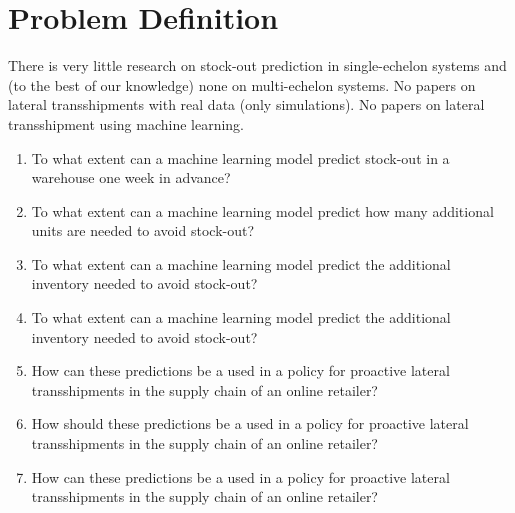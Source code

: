\documentclass[../../main.tex]{subfiles}
\begin{document}
\section{Problem Definition}

There is very little research on stock-out prediction in single-echelon systems and (to the best of our knowledge) none on multi-echelon systems. No papers on lateral transshipments with real data (only simulations). No papers on lateral transshipment using machine learning.

\begin{enumerate}
\item To what extent can a machine learning model predict stock-out in a warehouse one week in advance?
\item To what extent can a machine learning model predict how many additional units are needed to avoid stock-out?
\item To what extent can a machine learning model predict the additional inventory needed to avoid stock-out?
\item To what extent can a machine learning model predict the additional inventory needed to avoid stock-out?
\item How can these predictions be a used in a policy for proactive lateral transshipments in the supply chain of an online retailer?
\item How should these predictions be a used in a policy for proactive lateral transshipments in the supply chain of an online retailer?
\item How can these predictions be a used in a policy for proactive lateral transshipments in the supply chain of an online retailer?
\end{enumerate}


\end{document}
